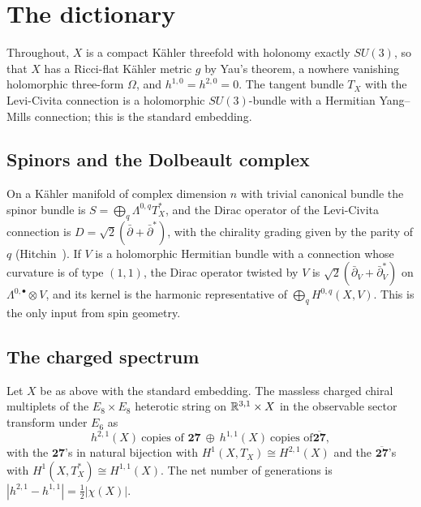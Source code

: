 \section{The dictionary}\label{sec:dictionary}

Throughout, $X$ is a compact K\"ahler threefold with holonomy exactly
$SU(3)$, so that $X$ has a Ricci-flat K\"ahler metric $g$ by Yau's
theorem, a nowhere vanishing holomorphic three-form $\Omega$, and
$h^{1,0}=h^{2,0}=0$. The tangent bundle $T_X$ with the Levi-Civita
connection is a holomorphic $SU(3)$-bundle with a Hermitian Yang--Mills
connection; this is the standard embedding.

\subsection{Spinors and the Dolbeault complex}

On a K\"ahler manifold of complex dimension $n$ with trivial canonical
bundle the spinor bundle is $S=\bigoplus_{q}\Lambda^{0,q}T^*_X$, and the
Dirac operator of the Levi-Civita connection is $D=\sqrt2(\bar\partial+
\bar\partial^*)$, with the chirality grading given by the parity of $q$
(Hitchin~\cite{Hit74}). If $V$ is a holomorphic Hermitian bundle with a
connection whose curvature is of type $(1,1)$, the Dirac operator twisted by
$V$ is $\sqrt2(\bar\partial_V+\bar\partial_V^*)$ on $\Lambda^{0,\bullet}
\otimes V$, and its kernel is the harmonic representative of
$\bigoplus_q H^{0,q}(X,V)$. This is the only input from spin geometry.

\subsection{The charged spectrum}

\begin{theorem}\label{thm:dictionary}
Let $X$ be as above with the standard embedding. The massless charged
chiral multiplets of the $E_8\times E_8$ heterotic string on $\mathbb{R}^{3,1}
\times X$ in the observable sector transform under $E_6$ as
\[
h^{2,1}(X)\ \text{copies of }\mathbf{27}\ \oplus\ h^{1,1}(X)\ \text{copies of
}\overline{\mathbf{27}},
\]
with the $\mathbf{27}$'s in natural bijection with $H^1(X,T_X)\cong
H^{2,1}(X)$ and the $\overline{\mathbf{27}}$'s with $H^1(X,T_X^*)\cong
H^{1,1}(X)$. The net number of generations is
$|h^{2,1}-h^{1,1}|=\tfrac12|\chi(X)|$.
\end{theorem}

